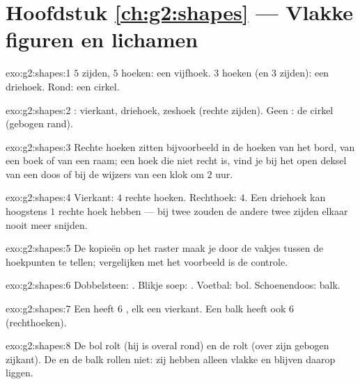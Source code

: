 \section*{Hoofdstuk \ref{ch:g2:shapes} --- Vlakke figuren en lichamen}

\begin{solution}{exo:g2:shapes:1}
$5$ zijden, $5$ hoeken: een vijfhoek. $3$ hoeken (en $3$ zijden): een
driehoek. Rond: een cirkel.
\end{solution}

\begin{solution}{exo:g2:shapes:2}
: vierkant, driehoek, zeshoek (rechte zijden). Geen :
de cirkel (gebogen rand).
\end{solution}

\begin{solution}{exo:g2:shapes:3}
Rechte hoeken zitten bijvoorbeeld in de hoeken van het bord, van een
boek of van een raam; een hoek die niet recht is, vind je bij het open
deksel van een doos of bij de wijzers van een klok om $2$ uur.
\end{solution}

\begin{solution}{exo:g2:shapes:4}
Vierkant: $4$ rechte hoeken. Rechthoek: $4$. Een driehoek kan hoogstens
$1$ rechte hoek hebben --- bij twee zouden de andere twee zijden elkaar
nooit meer snijden.
\end{solution}

\begin{solution}{exo:g2:shapes:5}
De kopieën op het raster maak je door de vakjes tussen de hoekpunten te
tellen; vergelijken met het voorbeeld is de controle.
\end{solution}

\begin{solution}{exo:g2:shapes:6}
Dobbelsteen: . Blikje soep: . Voetbal: bol. Schoenendoos:
balk.
\end{solution}

\begin{solution}{exo:g2:shapes:7}
Een  heeft $6$ , elk een vierkant. Een balk heeft ook $6$
 (rechthoeken).
\end{solution}

\begin{solution}{exo:g2:shapes:8}
De bol rolt (hij is overal rond) en de  rolt (over zijn gebogen
zijkant). De  en de balk rollen niet: zij hebben alleen vlakke
 en blijven daarop liggen.
\end{solution}

